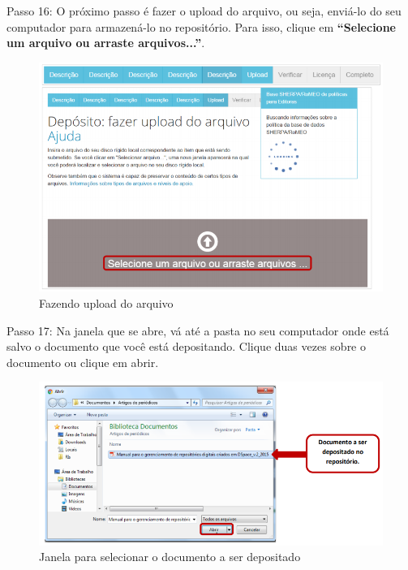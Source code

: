 \documentclass[12pt,hidelinks]{article}
\begin{document}
    Passo 16: O próximo passo é fazer o upload do arquivo, ou seja, enviá-lo do seu computador para armazená-lo no repositório. Para isso, clique em \textbf{“Selecione um arquivo ou arraste arquivos...”}.
    
    \begin{figure}[!htp]
                \centering
                \includegraphics[scale=0.8]{figura/Figura155.png}
                \caption{Fazendo upload do arquivo}
            \label{Rotulo}
        \end{figure}

\newpage
    
    Passo 17: Na janela que se abre, vá até a pasta no seu computador onde está salvo o documento que você está depositando. Clique duas vezes sobre o documento ou clique em abrir.
    
    \begin{figure}[!htp]
                \centering
                \includegraphics[scale=0.8]{figura/Figura156.png}
                \caption{Janela para selecionar o documento a ser depositado}
            \label{Rotulo}
        \end{figure}
\end{document}
